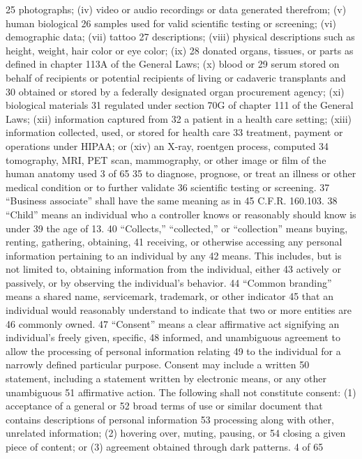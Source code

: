 25 photographs; (iv) video or audio recordings or data generated therefrom; (v) human biological
26 samples used for valid scientific testing or screening; (vi) demographic data; (vii) tattoo
27 descriptions; (viii) physical descriptions such as height, weight, hair color or eye color; (ix)
28 donated organs, tissues, or parts as defined in chapter 113A of the General Laws; (x) blood or
29 serum stored on behalf of recipients or potential recipients of living or cadaveric transplants and
30 obtained or stored by a federally designated organ procurement agency; (xi) biological materials
31 regulated under section 70G of chapter 111 of the General Laws; (xii) information captured from
32 a patient in a health care setting; (xiii) information collected, used, or stored for health care
33 treatment, payment or operations under HIPAA; or (xiv) an X-ray, roentgen process, computed
34 tomography, MRI, PET scan, mammography, or other image or film of the human anatomy used
3 of 65
35 to diagnose, prognose, or treat an illness or other medical condition or to further validate
36 scientific testing or screening.
37 “Business associate” shall have the same meaning as in 45 C.F.R. 160.103.
38 “Child” means an individual who a controller knows or reasonably should know is under
39 the age of 13.
40 “Collects,” “collected,” or “collection” means buying, renting, gathering, obtaining,
41 receiving, or otherwise accessing any personal information pertaining to an individual by any
42 means. This includes, but is not limited to, obtaining information from the individual, either
43 actively or passively, or by observing the individual’s behavior.
44 “Common branding” means a shared name, servicemark, trademark, or other indicator
45 that an individual would reasonably understand to indicate that two or more entities are
46 commonly owned.
47 “Consent” means a clear affirmative act signifying an individual’s freely given, specific,
48 informed, and unambiguous agreement to allow the processing of personal information relating
49 to the individual for a narrowly defined particular purpose. Consent may include a written
50 statement, including a statement written by electronic means, or any other unambiguous
51 affirmative action. The following shall not constitute consent: (1) acceptance of a general or
52 broad terms of use or similar document that contains descriptions of personal information
53 processing along with other, unrelated information; (2) hovering over, muting, pausing, or
54 closing a given piece of content; or (3) agreement obtained through dark patterns.
4 of 65
